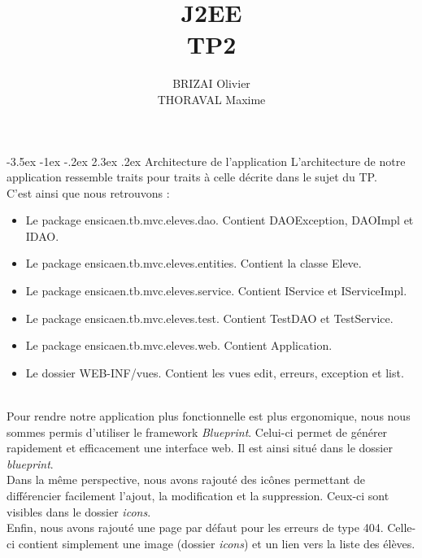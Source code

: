 \documentclass[a4paper,12pt]{article}
\makeatletter
\renewcommand\section{\@startsection {section}{1}{\z@}%
                           {-3.5ex \@plus -1ex \@minus -.2ex}%
                           {2.3ex \@plus.2ex}%
                           {\normalfont\Large\bfseries}}
\makeatother
\begin{document}
\newpage
\title{J2EE\\TP2}
\date{}
\author{BRIZAI Olivier\\THORAVAL Maxime}
\maketitle

\newpage
\section{Architecture de l'application}
L'architecture de notre application ressemble traits pour traits à celle décrite dans le sujet du TP.\\
C'est ainsi que nous retrouvons :
\begin{itemize}
	\item Le package ensicaen.tb.mvc.eleves.dao. Contient DAOException, DAOImpl et IDAO.
	\item Le package ensicaen.tb.mvc.eleves.entities. Contient la classe Eleve.
	\item Le package ensicaen.tb.mvc.eleves.service. Contient IService et IServiceImpl.
	\item Le package ensicaen.tb.mvc.eleves.test. Contient TestDAO et TestService.
	\item Le package ensicaen.tb.mvc.eleves.web. Contient Application.
	\item Le dossier WEB-INF/vues. Contient les vues edit, erreurs, exception et list.
\end{itemize}
~\\

Pour rendre notre application plus fonctionnelle est plus ergonomique, nous nous sommes permis d'utiliser le framework \textit{Blueprint}.
Celui-ci permet de générer rapidement et efficacement une interface web. Il est ainsi situé dans le dossier \textit{blueprint}.\\
Dans la même perspective, nous avons rajouté des icônes permettant de différencier facilement l'ajout, la modification et la suppression. 
Ceux-ci sont visibles dans le dossier \textit{icons}.\\
Enfin, nous avons rajouté une page par défaut pour les erreurs de type 404. Celle-ci contient simplement une image (dossier \textit{icons}) et
un lien vers la liste des élèves.
\end{document}
